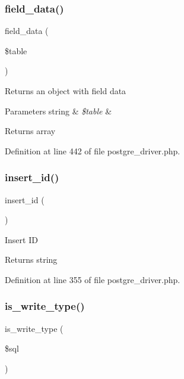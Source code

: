 \subsubsection{\texorpdfstring{field\_data()}{field\_data()}}
{\footnotesize\ttfamily field\+\_\+data (\begin{DoxyParamCaption}\item[{}]{\$table }\end{DoxyParamCaption})}

Returns an object with field data


\begin{DoxyParams}[1]{Parameters}
string & {\em \$table} & \\
\hline
\end{DoxyParams}
\begin{DoxyReturn}{Returns}
array 
\end{DoxyReturn}


Definition at line 442 of file postgre\+\_\+driver.\+php.

\mbox{\label{class_c_i___d_b__postgre__driver_a933f2cde8dc7f87875e257d0a4902e99}} 
\subsubsection{\texorpdfstring{insert\_id()}{insert\_id()}}
{\footnotesize\ttfamily insert\+\_\+id (\begin{DoxyParamCaption}{ }\end{DoxyParamCaption})}

Insert ID

\begin{DoxyReturn}{Returns}
string 
\end{DoxyReturn}


Definition at line 355 of file postgre\+\_\+driver.\+php.

\mbox{\label{class_c_i___d_b__postgre__driver_af435df5703c238769d6d16fde6d51182}} 
\subsubsection{\texorpdfstring{is\_write\_type()}{is\_write\_type()}}
{\footnotesize\ttfamily is\+\_\+write\+\_\+type (\begin{DoxyParamCaption}\item[{}]{\$sql }\end{DoxyParamCaption})}

